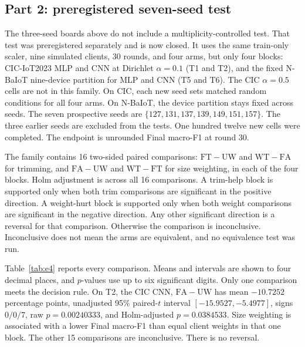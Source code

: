 \documentclass{ieeeaccess}
\begin{document}
\subsection{Part 2: preregistered seven-seed test}
\label{sec:e4}
The three-seed boards above do not include a multiplicity-controlled test. That test was preregistered separately and is now closed. It uses the same train-only scaler, nine simulated clients, 30 rounds, and four arms, but only four blocks: CIC-IoT2023 MLP and CNN at Dirichlet $\alpha=0.1$ (T1 and T2), and the fixed N-BaIoT nine-device partition for MLP and CNN (T5 and T6). The CIC $\alpha=0.5$ cells are not in this family. On CIC, each new seed sets matched random conditions for all four arms. On N-BaIoT, the device partition stays fixed across seeds. The seven prospective seeds are $\{127,131,137,139,149,151,157\}$. The three earlier seeds are excluded from the tests. One hundred twelve new cells were completed. The endpoint is unrounded Final macro-F1 at round 30.

The family contains 16 two-sided paired comparisons: $\mathrm{FT}-\mathrm{UW}$ and $\mathrm{WT}-\mathrm{FA}$ for trimming, and $\mathrm{FA}-\mathrm{UW}$ and $\mathrm{WT}-\mathrm{FT}$ for size weighting, in each of the four blocks. Holm adjustment is across all 16 comparisons. A trim-help block is supported only when both trim comparisons are significant in the positive direction. A weight-hurt block is supported only when both weight comparisons are significant in the negative direction. Any other significant direction is a reversal for that comparison. Otherwise the comparison is inconclusive. Inconclusive does not mean the arms are equivalent, and no equivalence test was run.

Table~\ref{tab:e4} reports every comparison. Means and intervals are shown to four decimal places, and $p$-values use up to six significant digits. Only one comparison meets the decision rule. On T2, the CIC CNN, $\mathrm{FA}-\mathrm{UW}$ has mean $-10.7252$ percentage points, unadjusted 95\% paired-$t$ interval $[-15.9527,-5.4977]$, signs $0/0/7$, raw $p=0.00240333$, and Holm-adjusted $p=0.0384533$. Size weighting is associated with a lower Final macro-F1 than equal client weights in that one block. The other 15 comparisons are inconclusive. There is no reversal.
\end{document}
